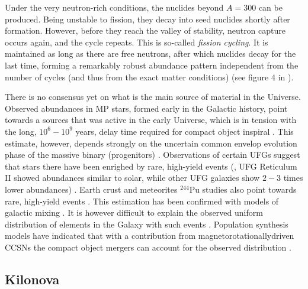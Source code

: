 %

Under the very neutron-rich conditions, 
the nuclides beyond $A=300$ can be produced. Being unstable to fission, they 
decay into seed nuclides shortly after formation.
However, before they reach the valley of stability, neutron capture occurs again, and the cycle repeats.
This is so-called \textit{fission cycling}.
It is maintained as long as there are free neutrons, after which nuclides decay 
for the last time, forming a remarkably robust abundance pattern independent from the 
number of cycles (and thus from the exact matter conditions) 
(see figure 4 in \citet{Korobkin:2012uy}). 

There is no consensus yet on what is the main source of \rproc{} material in the 
Universe. 
Observed \rproc{} abundances in \ac{MP} stars, formed early in the Galactic history, 
point towards a sources that was active in the early Universe, which is in tension with the long, 
$10^{6} - 10^{9}$ years, delay time required for compact object inspiral 
\citep{DeDonder:2004cx,Dominik:2012kk}. This estimate, however, depends strongly on the 
uncertain common envelop evolution phase of the massive binary (progenitors)
\citep[\eg][]{Dominik:2012kk}.
%
Observations of certain \acp{UFG} suggest that stars there have been enrighed by rare, 
high-yield events (\eg, \ac{UFG} Reticulum II showed abundances similar to solar, 
while other \ac{UFG} galaxies show $2-3$ times lower abundances) \citep{Ji:2016}.
%
Earth crust and meteorites $^{244}$Pu studies also point towards rare, high-yield 
events \citep{Wallner:2015,Tsujimoto:2017}. This estimation has been confirmed with 
models of galactic mixing \citep{Hotokezaka:2015zea}.
%
It is however difficult to explain the observed uniform distribution of \rproc{} 
elements in the Galaxy with such events \citep{Argast:2003he}.
%
Population synthesis models have indicated that with a contribution from 
magnetorotationallydriven \acp{CCSN} the compact object mergers can account for the 
observed distribution \citep{Ishimaru:2015,Cescutti:2015,Wehmeyer:2015,VanDeVoort:2015}.



\subsection{Kilonova}\label{sec:intro:kilonova}


